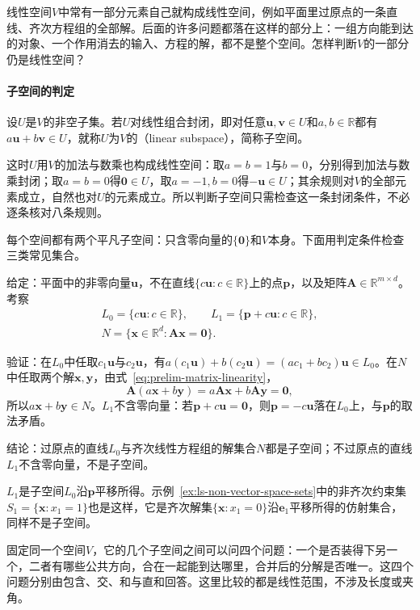 线性空间$V$中常有一部分元素自己就构成线性空间，例如平面里过原点的一条直线、齐次方程组的全部解。后面的许多问题都落在这样的部分上：一组方向能到达的对象、一个作用消去的输入、方程的解，都不是整个空间。怎样判断$V$的一部分仍是线性空间？

\paragraph{子空间的判定}
设$U$是$V$的非空子集。若$U$对线性组合封闭，即对任意$\bm u,\bm v\in U$和$a,b\in\mathbb R$都有$a\bm u+b\bm v\in U$，就称$U$为$V$的（linear subspace），简称子空间。

这时$U$用$V$的加法与数乘也构成线性空间：取$a=b=1$与$b=0$，分别得到加法与数乘封闭；取$a=b=0$得$\bm0\in U$，取$a=-1,b=0$得$-\bm u\in U$；其余规则对$V$的全部元素成立，自然也对$U$的元素成立。所以判断子空间只需检查这一条封闭条件，不必逐条核对八条规则。

每个空间都有两个平凡子空间：只含零向量的$\{\bm0\}$和$V$本身。下面用判定条件检查三类常见集合。
\begin{example}
\label{ex:ls-subspace-checks}
给定：平面中的非零向量$\bm u$，不在直线$\{c\bm u:c\in\mathbb R\}$上的点$\bm p$，以及矩阵$\bm A\in\mathbb R^{m\times d}$。考察
\[
 \begin{gathered}
 L_0=\{c\bm u:c\in\mathbb R\},
 \qquad
 L_1=\{\bm p+c\bm u:c\in\mathbb R\},\\
 N=\{\bm x\in\mathbb R^d:\bm A\bm x=\bm0\}.
 \end{gathered}
\]

验证：在$L_0$中任取$c_1\bm u$与$c_2\bm u$，有$a(c_1\bm u)+b(c_2\bm u)=(ac_1+bc_2)\bm u\in L_0$。在$N$中任取两个解$\bm x,\bm y$，由式~\eqref{eq:prelim-matrix-linearity}，
\[
 \bm A(a\bm x+b\bm y)=a\bm A\bm x+b\bm A\bm y=\bm0,
\]
所以$a\bm x+b\bm y\in N$。$L_1$不含零向量：若$\bm p+c\bm u=\bm0$，则$\bm p=-c\bm u$落在$L_0$上，与$\bm p$的取法矛盾。

结论：过原点的直线$L_0$与齐次线性方程组的解集合$N$都是子空间；不过原点的直线$L_1$不含零向量，不是子空间。
\end{example}
$L_1$是子空间$L_0$沿$\bm p$平移所得。示例~\ref{ex:ls-non-vector-space-sets}中的非齐次约束集$S_1=\{\bm x:x_1=1\}$也是这样，它是齐次解集$\{\bm x:x_1=0\}$沿$\bm e_1$平移所得的仿射集合，同样不是子空间。

固定同一个空间$V$，它的几个子空间之间可以问四个问题：一个是否装得下另一个，二者有哪些公共方向，合在一起能到达哪里，合并后的分解是否唯一。这四个问题分别由包含、交、和与直和回答。这里比较的都是线性范围，不涉及长度或夹角。

